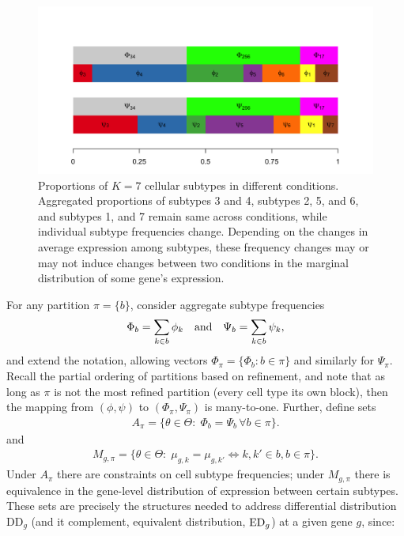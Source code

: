 \documentclass[aoas,preprint]{imsart}
\begin{document}
\begin{figure}[h!]
  \includegraphics[width=\linewidth]{Figs/schematic-1.png}
  \caption{Proportions of $K=7$ cellular subtypes in different conditions. 
 Aggregated proportions of subtypes 3 and 4, subtypes 2, 5, and 6, and subtypes 1, and 7 
 remain same across conditions, while individual subtype frequencies change. 
 Depending on the changes in average expression among subtypes, these frequency changes
may or may not induce changes between two conditions  in the  marginal distribution of some gene's expression.  }
  \label{fig:scheme}
\end{figure}


For any partition $\pi=\{b\}$, consider aggregate subtype frequencies
\begin{eqnarray*}
\Phi_b = \sum_{k\in b} \phi_k \quad {\mbox {\rm  and}} \quad 
 \Psi_b = \sum_{k\in b} \psi_k,
\end{eqnarray*}
and extend the notation, allowing vectors $\Phi_\pi = \{ \Phi_b: b \in \pi \}$ and similarly
for $\Psi_\pi$. Recall the partial ordering of partitions based on refinement, and note that
as long as $\pi$ is not the most refined partition (every cell type its own block),
then the mapping from $( \phi, \psi )$ to $( \Phi_\pi, \Psi_\pi)$ is many-to-one.
Further, define sets
\begin{eqnarray}
\label{eq:asets}
A_\pi = \{ \theta\in \Theta: \; \Phi_b = \Psi_b  \, \forall b \in \pi \}.
\end{eqnarray}
and
\begin{eqnarray}
\label{eq:msets}
M_{g,\pi} = \{ \theta \in \Theta: \; \mu_{g,k} = \mu_{g,k'} \iff k,k' \in b, b \in \pi \}.
\end{eqnarray}
Under $A_\pi$ there are constraints on cell subtype frequencies; under $M_{g,\pi}$ there is 
equivalence in the gene-level distribution of expression between certain subtypes.
These sets are precisely the
structures needed to address differential distribution DD$_g$ (and
it complement, equivalent distribution, ${\rm ED}_g$) at a given gene
$g$, since:
\end{document}
